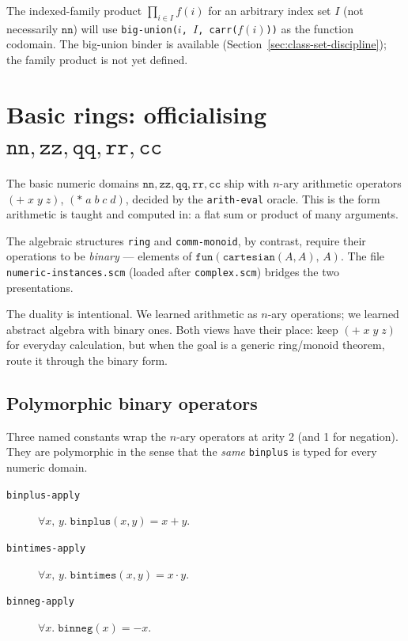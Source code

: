 \begin{remark}
The indexed-family product $\prod_{i \in I} f(i)$ for an arbitrary
index set $I$ (not necessarily $\mathtt{nn}$) will use
\texttt{big-union($i$, $I$, carr($f(i)$))} as the function codomain.
The big-union binder is available
(Section~\ref{sec:class-set-discipline}); the family product is not yet
defined.
\end{remark}

\section{Basic rings: officialising $\mathtt{nn}, \mathtt{zz}, \mathtt{qq}, \mathtt{rr}, \mathtt{cc}$}
\label{sec:basic-rings}

The basic numeric domains $\mathtt{nn}, \mathtt{zz}, \mathtt{qq},
\mathtt{rr}, \mathtt{cc}$ ship with $n$-ary arithmetic operators
$(+\; x\; y\; z)$, $(*\; a\; b\; c\; d)$, decided by the
\texttt{arith-eval} oracle.  This is the form arithmetic is taught and
computed in: a flat sum or product of many arguments.

The algebraic structures \texttt{ring} and \texttt{comm-monoid}, by
contrast, require their operations to be \emph{binary} ---
elements of $\mathtt{fun}(\mathtt{cartesian}(A, A),\, A)$.  The file
\texttt{numeric-instances.scm} (loaded after \texttt{complex.scm}) bridges
the two presentations.

\begin{remark}
The duality is intentional.  We learned arithmetic as $n$-ary
operations; we learned abstract algebra with binary ones.  Both views
have their place: keep $(+\; x\; y\; z)$ for everyday calculation, but
when the goal is a generic ring/monoid theorem, route it through the
binary form.
\end{remark}

\subsection{Polymorphic binary operators}

Three named constants wrap the $n$-ary operators at arity 2 (and 1 for
negation).  They are polymorphic in the sense that the \emph{same}
\texttt{binplus} is typed for every numeric domain.

\begin{description}
\item[\texttt{binplus-apply}]
  $\forall x,\, y.\;\mathtt{binplus}(x, y) = x + y$.
\item[\texttt{bintimes-apply}]
  $\forall x,\, y.\;\mathtt{bintimes}(x, y) = x \cdot y$.
\item[\texttt{binneg-apply}]
  $\forall x.\;\mathtt{binneg}(x) = -x$.
\end{description}

